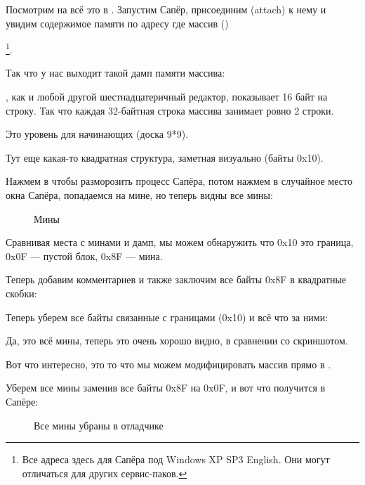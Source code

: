 Посмотрим на всё это в \olly.
Запустим Сапёр, присоединим (attach) \olly к нему и увидим содержимое памяти по адресу где массив  ()%

\footnote{Все адреса здесь для Сапёра под Windows XP SP3 English. 
Они могут отличаться для других сервис-паков.}.

Так что у нас выходит такой дамп памяти массива:



\olly, как и любой другой шестнадцатеричный редактор, показывает 16 байт на строку.
Так что каждая 32-байтная строка массива занимает ровно 2 строки.

Это уровень для начинающих (доска 9*9).

Тут еще какая-то квадратная структура, заметная визуально (байты 0x10).

Нажмем  в \olly чтобы разморозить процесс Сапёра, потом нажмем в случайное место окна Сапёра, попадаемся на мине, но теперь
видны все мины:

\begin{figure}[H]
\centering
{}
\caption{Мины}
\label{fig:minesweeper1}
\end{figure}

Сравнивая места с минами и дамп, мы можем обнаружить что 0x10 это граница, 0x0F --- пустой блок, 
0x8F --- мина.

Теперь добавим комментариев и также заключим все байты 0x8F в квадратные скобки:%



Теперь уберем все байты связанные с границами (0x10) и всё что за ними:%



Да, это всё мины, теперь это очень хорошо видно, в сравнении со скриншотом.

\clearpage
Вот что интересно, это то что мы можем модифицировать массив прямо в \olly.%

Уберем все мины заменив все байты 0x8F на 0x0F, и вот что получится в Сапёре:

\begin{figure}[H]
\centering
{}
\caption{Все мины убраны в отладчике}
\label{fig:minesweeper3}
\end{figure}

